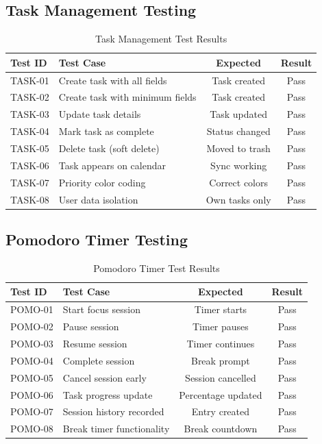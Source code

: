 \subsection{Task Management Testing}
\begin{table}[H]
\centering
\begin{tabular}{|l|p{5cm}|c|c|}
\hline
\textbf{Test ID} & \textbf{Test Case} & \textbf{Expected} & \textbf{Result} \\
\hline
TASK-01 & Create task with all fields & Task created & Pass \\
TASK-02 & Create task with minimum fields & Task created & Pass \\
TASK-03 & Update task details & Task updated & Pass \\
TASK-04 & Mark task as complete & Status changed & Pass \\
TASK-05 & Delete task (soft delete) & Moved to trash & Pass \\
TASK-06 & Task appears on calendar & Sync working & Pass \\
TASK-07 & Priority color coding & Correct colors & Pass \\
TASK-08 & User data isolation & Own tasks only & Pass \\
\hline
\end{tabular}
\caption{Task Management Test Results}
\end{table}

\subsection{Pomodoro Timer Testing}
\begin{table}[H]
\centering
\begin{tabular}{|l|p{5cm}|c|c|}
\hline
\textbf{Test ID} & \textbf{Test Case} & \textbf{Expected} & \textbf{Result} \\
\hline
POMO-01 & Start focus session & Timer starts & Pass \\
POMO-02 & Pause session & Timer pauses & Pass \\
POMO-03 & Resume session & Timer continues & Pass \\
POMO-04 & Complete session & Break prompt & Pass \\
POMO-05 & Cancel session early & Session cancelled & Pass \\
POMO-06 & Task progress update & Percentage updated & Pass \\
POMO-07 & Session history recorded & Entry created & Pass \\
POMO-08 & Break timer functionality & Break countdown & Pass \\
\hline
\end{tabular}
\caption{Pomodoro Timer Test Results}
\end{table}


